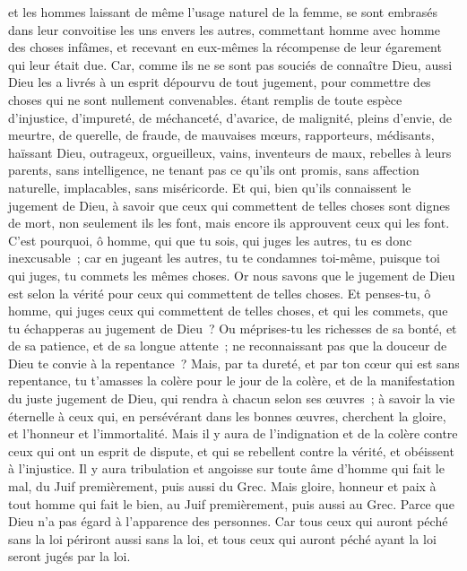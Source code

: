 \begin{multicols}{2}
et les hommes laissant de même l'usage naturel de la femme, se sont embrasés dans leur convoitise les uns envers les autres, commettant homme avec homme des choses infâmes, et recevant en eux-mêmes la récompense de leur égarement qui leur était due.
Car, comme ils ne se sont pas souciés de connaître Dieu, aussi Dieu les a livrés à un esprit dépourvu de tout jugement, pour commettre des choses qui ne sont nullement convenables.
étant remplis de toute espèce d'injustice, d'impureté, de méchanceté, d'avarice, de malignité, pleins d'envie, de meurtre, de querelle, de fraude, de mauvaises mœurs,
rapporteurs, médisants, haïssant Dieu, outrageux, orgueilleux, vains, inventeurs de maux, rebelles à leurs parents,
sans intelligence, ne tenant pas ce qu'ils ont promis, sans affection naturelle, implacables, sans miséricorde.
Et qui, bien qu'ils connaissent le jugement de Dieu, à savoir que ceux qui commettent de telles choses sont dignes de mort, non seulement ils les font, mais encore ils approuvent ceux qui les font.
\VerseOne{}C'est pourquoi, ô homme, qui que tu sois, qui juges les autres, tu es donc inexcusable~; car en jugeant les autres, tu te condamnes toi-même, puisque toi qui juges, tu commets les mêmes choses.
Or nous savons que le jugement de Dieu est selon la vérité pour ceux qui commettent de telles choses.
Et penses-tu, ô homme, qui juges ceux qui commettent de telles choses, et qui les commets, que tu échapperas au jugement de Dieu~?
Ou méprises-tu les richesses de sa bonté, et de sa patience, et de sa longue attente~; ne reconnaissant pas que la douceur de Dieu te convie à la repentance~?
Mais, par ta dureté, et par ton cœur qui est sans repentance, tu t'amasses la colère pour le jour de la colère, et de la manifestation du juste jugement de Dieu,
qui rendra à chacun selon ses œuvres~;
à savoir la vie éternelle à ceux qui, en persévérant dans les bonnes œuvres, cherchent la gloire, et l'honneur et l'immortalité.
Mais il y aura de l'indignation et de la colère contre ceux qui ont un esprit de dispute, et qui se rebellent contre la vérité, et obéissent à l'injustice.
Il y aura tribulation et angoisse sur toute âme d'homme qui fait le mal, du Juif premièrement, puis aussi du Grec.
Mais gloire, honneur et paix à tout homme qui fait le bien, au Juif premièrement, puis aussi au Grec.
Parce que Dieu n'a pas égard à l'apparence des personnes.
Car tous ceux qui auront péché sans la loi périront aussi sans la loi, et tous ceux qui auront péché ayant la loi seront jugés par la loi.

\end{multicols}
